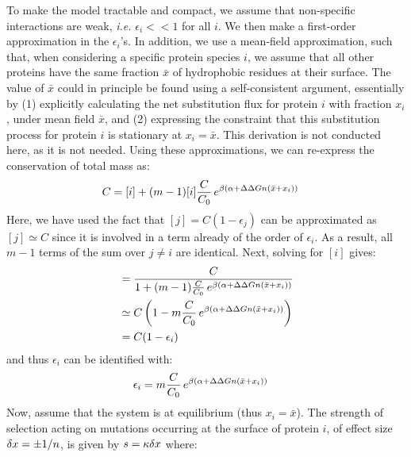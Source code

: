 To make the model tractable and compact, we assume that non-specific interactions are weak, \textit{i.e.} $\epsilon_i << 1$ for all $i$. We then make a first-order approximation in the $\epsilon_i$'s.
In addition, we use a mean-field approximation, such that, when considering a specific protein species $i$, we assume that all other proteins have the same fraction $\bar x$ of hydrophobic residues at their surface.
The value of $\bar x$ could in principle be found using a self-consistent argument, essentially by (1) explicitly calculating the net substitution flux for protein $i$ with fraction $x_i$, under mean field $\bar x$, and (2) expressing the constraint that this substitution process for protein $i$ is stationary at $x_i = \bar x$.
This derivation is not conducted here, as it is not needed.
Using these approximations, we can re-express the conservation of total mass as:
\begin{align}
C & = [i] + (m-1) [i] \frac{C}{C_0} \, e^{\beta (\alpha + \Delta \Delta G n (\bar x + x_i))}
\end{align}
Here, we have used the fact that $[j] = C(1 - \epsilon_j)$ can be approximated as $[j] \simeq C$ since it is involved in a term already of the order of $\epsilon_i$. As a result, all $m-1$ terms of the sum over $j\neq i$ are identical.
Next, solving for $[i]$ gives:
\begin{align}
[i] & = \frac{C} {1 + (m-1) \frac{C}{C_0} \, e^{\beta (\DeltaGmin + \DeltaDeltaG \NbrSites (\bar x + x_i))}}
\\ & \simeq C \left( 1 - m \frac{C}{C_0} \, e^{\beta (\DeltaGmin + \DeltaDeltaG \NbrSites (\bar x + x_i))} \right)
\\ & =
C (1 - \epsilon_i)
\end{align}
and thus $\epsilon_i$ can be identified with:
\begin{align}
\epsilon_i  & = m \frac{C}{C_0} \, e^{\beta (\alpha +\Delta \Delta G n (\bar x + x_i))}
\end{align}
Now, assume that the system is at equilibrium (thus $x_i = \bar x$).
The strength of selection acting on mutations occurring at the surface of protein $i$, of effect size $\delta x = \pm 1/n$, is given by $s = \kappa \delta x$ where:

